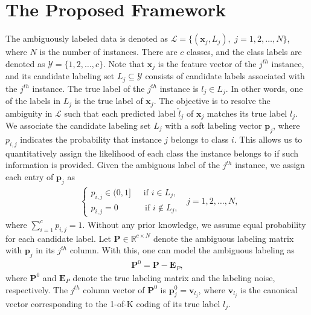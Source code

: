 \documentclass[10pt,journal,compsoc]{IEEEtran}
\begin{document}
\section{The Proposed Framework} \label{Chapter_MCar:sec:Approach}
The ambiguously labeled data is denoted as $\mathcal{L} = \{(\mathbf{x}_j, L_j),\,\, j=1, 2, \dots, N\}$, where $N$ is the number of instances. There are $c$ classes, and the class labels are denoted as $\mathcal{Y} =\{1, 2, \dots, c\}$. Note that $\mathbf{x}_j$ is the feature vector of the $j^{th}$ instance, and its candidate labeling set $L_j \subseteq \mathcal{Y}$ consists of candidate labels associated with the $j^{th}$ instance.
The true label of the $j^{th}$ instance is $l_j \in L_j$. In other words, one of the labels in $L_j$ is the true label of $\mathbf{x}_j$. The objective is to resolve the ambiguity in $\mathcal{L}$ such that each predicted label $\hat{l}_j$ of $\mathbf{x}_j$ matches its true label $l_j$.
We associate the candidate labeling set $L_j$ with a soft labeling vector $\mathbf{p}_j$, where $p_{i,j}$ indicates the probability that instance $j$ belongs to class $i$. This allows us to quantitatively assign the likelihood of each class the instance belongs to if such information is provided.
Given the ambiguous label of the $j^{th}$ instance, we assign each entry of $\mathbf{p}_j$ as
\begin{equation}
\begin{aligned}
\left\{
\begin{array}{ll}
p_{i,j} \in (0, 1]  \quad\,\,\, \mathrm{if}  \,\, i \in L_j,\, \\
p_{i,j} = 0 \quad\,\quad\quad \mathrm{if} \,\, i \notin L_j,\,
 \end{array} \right.
\end{aligned} j = 1, 2, \dots, N,
\end{equation}
where $\sum_{i=1}^c p_{i,j} = 1$. Without any prior knowledge, we assume equal probability for each candidate label.  Let $\mathbf{P} \in \mathbb{R}^{c \times N}$ denote the ambiguous labeling matrix with $\mathbf{p}_j$ in its $j^{th}$ column.  With this, one can model the ambiguous labeling as
\begin{equation}
\begin{aligned}
\mathbf{P}^0 = \mathbf{P} - \mathbf{E}_P, \label{eq:P}
\end{aligned}
\end{equation}
where $\mathbf{P}^0$ and $\mathbf{E}_P$ denote the true labeling matrix and the labeling noise, respectively.  The $j^{th}$ column vector of $\mathbf{P}^0$ is $\mathbf{p}^0_j = \mathbf{v}_{l_j}$, where $\mathbf{v}_{l_j}$ is the canonical vector corresponding to the 1-of-K coding of its true label $l_j$.
\end{document}
